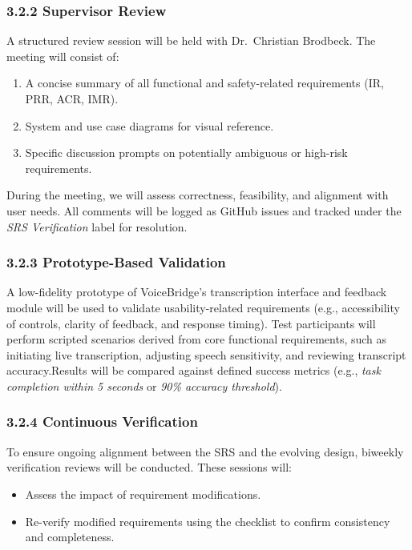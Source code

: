 \documentclass[12pt, titlepage]{article}
\begin{document}
\subsubsection*{3.2.2 Supervisor Review}
A structured review session will be held with Dr.~Christian Brodbeck. The meeting will consist of:

\begin{enumerate}
    \item A concise summary of all functional and safety-related requirements (IR, PRR, ACR, IMR).
    \item System and use case diagrams for visual reference.
    \item Specific discussion prompts on potentially ambiguous or high-risk requirements.
\end{enumerate}

During the meeting, we will assess correctness, feasibility, and alignment with user needs. All comments will be logged as GitHub issues and tracked under the \textit{SRS Verification} label for resolution.

\subsubsection*{3.2.3 Prototype-Based Validation}
A low-fidelity prototype of VoiceBridge’s transcription interface and feedback module will be used to validate usability-related requirements (e.g., accessibility of controls, clarity of feedback, and response timing). Test participants will perform scripted scenarios derived from core functional requirements, such as initiating live transcription, adjusting speech sensitivity, and reviewing transcript accuracy.Results will be compared against defined success metrics (e.g., \textit{task completion within 5 seconds} or \textit{90\% accuracy threshold}).

\subsubsection*{3.2.4 Continuous Verification}
To ensure ongoing alignment between the SRS and the evolving design, biweekly verification reviews will be conducted. These sessions will:
\begin{itemize}
    \item Assess the impact of requirement modifications.
    \item Re-verify modified requirements using the checklist to confirm consistency and completeness.
\end{itemize}
\end{document}
